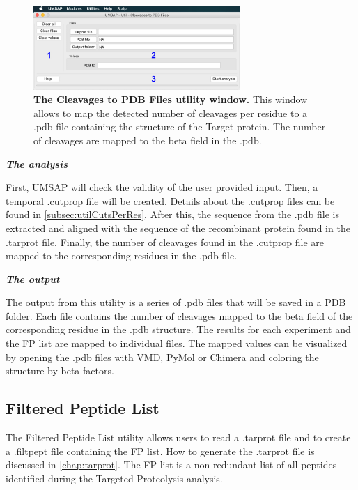\begin{figure}[h]
	\centering
	\includegraphics[width=0.7\textwidth]{./IMAGES/UTIL-PDB-WINDOW/util-pdb.jpg}	    
	\caption[The Cleavages to PDB Files utility window]{\textbf{The Cleavages to PDB Files utility window.} This window allows to map the detected number of cleavages per residue to a .pdb file containing the structure of the Target protein. The number of cleavages are mapped to the beta field in the .pdb.} 
	\label{fig:utilCut2PDB}
	\vspace{-5pt} 	
\end{figure}

\textit{\textbf{The analysis}}

First, UMSAP will check the validity of the user provided input. Then, a temporal .cutprop file will be created. Details about the .cutprop files can be found in \autoref{subsec:utilCutsPerRes}. After this, the sequence from the .pdb file is extracted and aligned with the sequence of the recombinant protein found in the .tarprot file. Finally, the number of cleavages found in the .cutprop file are mapped to the corresponding residues in the .pdb file.

\textit{\textbf{The output}}

The output from this utility is a series of .pdb files that will be saved in a PDB folder. Each file contains the number of cleavages mapped to the beta field of the corresponding residue in the .pdb structure. The results for each experiment and the FP list are mapped to individual files. The mapped values can be visualized by opening the .pdb files with VMD, PyMol or Chimera and coloring the structure by beta factors.

\subsection{Filtered Peptide List}
\label{subsec:utilFiltPept}

The Filtered Peptide List utility allows users to read a .tarprot file and to create a .filtpept file containing the FP list. How to generate the .tarprot file is discussed in \autoref{chap:tarprot}. The FP list is a non redundant list of all peptides identified during the Targeted Proteolysis analysis.

